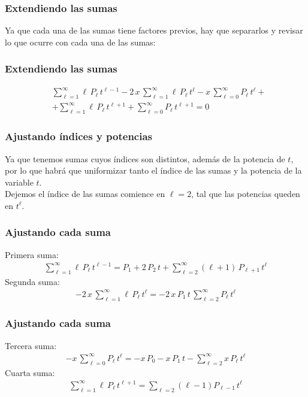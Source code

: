 \begin{frame}
\frametitle{Extendiendo las sumas}
Ya que cada una de las sumas tiene factores previos, hay que separarlos y revisar lo que ocurre con cada una de las sumas:
\end{frame}
\begin{frame}
\frametitle{Extendiendo las sumas}
\begin{align*}
&\sum_{\ell=1}^{\infty} \ell \, P_{\ell} \, t^{\ell-1} - 2 \, x \, \sum_{\ell=1}^{\infty} \ell \, P_{\ell} \, t^{\ell} - x \, \sum_{\ell=0}^{\infty} P_{\ell} \, t^{\ell} + \\[0.5em]
&+ \sum_{\ell=1}^{\infty} \ell \, P_{\ell} \, t^{\ell+1} + \sum_{\ell=0}^{\infty} P_{\ell} \, t^{\ell+1} = 0
\end{align*}
\end{frame}
\begin{frame}
\frametitle{Ajustando índices y potencias}
Ya que tenemos sumas cuyos índices son distintos, además de la potencia de $t$, por lo que habrá que uniformizar tanto el índice de las sumas y la potencia de la variable $t$.
\\
\bigskip
\pause
Dejemos el índice de las sumas comience en $\ell = 2$, tal que las potencias queden en $t^{\ell}$. 
\end{frame}
\begin{frame}
\frametitle{Ajustando cada suma}
Primera suma:
\begin{align*}
\sum_{\ell=1}^{\infty} \ell \, P_{\ell} \, t^{\ell-1} = P_{1} +  2 \, P_{2} \, t + \sum_{\ell=2}^{\infty} (\ell + 1) \, P_{\ell+1} \, t^{\ell}
\end{align*}
\pause
Segunda suma:
\begin{align*}
- 2 \, x \, \sum_{\ell=1}^{\infty} \ell \, P_{\ell} \, t^{\ell} = - 2 \, x \, P_{1} \, t \,  \sum_{\ell=2}^{\infty} P_{\ell} \, t^{\ell}
\end{align*}
\end{frame}
\begin{frame}
\frametitle{Ajustando cada suma}
Tercera suma:
\begin{align*}
- x \, \sum_{\ell=0}^{\infty} P_{\ell} \, t^{\ell} = - x \, P_{0} - x \, P_{1} \, t - \sum_{\ell=2}^{\infty} x \, P_{\ell} \, t^{\ell}
\end{align*}
\pause
Cuarta suma:
\begin{align*}
\sum_{\ell=1}^{\infty} \ell \, P_{\ell} \, t^{\ell+1} = \sum_{\ell=2} (\ell - 1) P_{\ell-1} \, t^{\ell}
\end{align*}
\end{frame}
